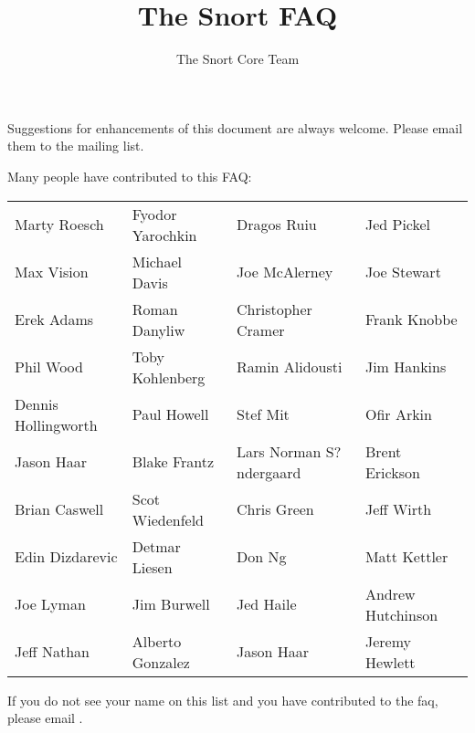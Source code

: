\documentclass{article}
\begin{document}
\title{ The Snort FAQ }
\author{ The Snort Core Team }
\date{ }


\maketitle

\newpage

Suggestions for enhancements of this document are always welcome.  Please
email them to the  mailing list. 

Many people have contributed to this FAQ:
\begin{center}
\begin{tabular}{llll}
 Marty Roesch   &  Fyodor Yarochkin    &   Dragos Ruiu      &     Jed Pickel\\

    Max Vision   &    Michael Davis     &   Joe McAlerney    &      Joe Stewart\\

    Erek Adams    &   Roman Danyliw   &   Christopher Cramer  &    Frank Knobbe\\

     Phil Wood     & Toby Kohlenberg   &   Ramin Alidousti     &    Jim Hankins\\

Dennis Hollingworth &  Paul Howell      &      Stef Mit         &   Ofir Arkin\\

    Jason Haar       & Blake Frantz &  Lars Norman S?ndergaard  & Brent Erickson\\

   Brian Caswell  &  Scot Wiedenfeld &       Chris Green        &   Jeff Wirth\\

  Edin Dizdarevic  &  Detmar Liesen   &         Don Ng       &     Matt Kettler\\

     Joe Lyman      &  Jim Burwell     &      Jed Haile      &   Andrew Hutchinson\\

    Jeff Nathan   &  Alberto Gonzalez   &     Jason Haar    &    Jeremy Hewlett
\end{tabular}
\end{center}





If you do not see your name on this list and you have contributed to the faq,
please email .
\end{document}
